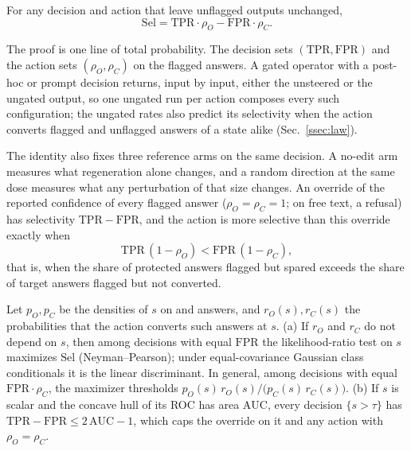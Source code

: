 \begin{proposition}
\label{prop:account}
For any decision and action that leave unflagged outputs unchanged,
\begin{equation}
\mathrm{Sel}=\mathrm{TPR}\cdot\rho_O-\mathrm{FPR}\cdot\rho_C .
\label{eq:account}
\end{equation}
\end{proposition}

The proof is one line of total probability. The decision sets
$(\mathrm{TPR},\mathrm{FPR})$ and the action sets $(\rho_O,\rho_C)$ on the
flagged answers. A gated operator with a post-hoc or prompt decision returns,
input by input, either the unsteered or the ungated output, so one ungated run
per action composes every such configuration; the ungated rates also predict
its selectivity when the action converts flagged and unflagged answers of a
state alike (Sec.~\ref{ssec:law}).

The identity also fixes three reference arms on the same decision. A no-edit
arm measures what regeneration alone changes, and a random direction at the
same dose measures what any perturbation of that size changes. An override of
the reported confidence of every flagged answer ($\rho_O=\rho_C=1$; on free
text, a refusal) has selectivity $\mathrm{TPR}-\mathrm{FPR}$, and the action is
more selective than this override exactly when
\begin{equation}
\mathrm{TPR}\,(1-\rho_O)<\mathrm{FPR}\,(1-\rho_C),
\label{eq:override}
\end{equation}
that is, when the share of protected answers flagged but spared exceeds the
share of target answers flagged but not converted.

\begin{theorem}
\label{thm:gate}
Let $p_O,p_C$ be the densities of $s$ on \ocw{} and \crok{} answers, and
$r_O(s),r_C(s)$ the probabilities that the action converts such answers at
$s$.
(a) If $r_O$ and $r_C$ do not depend on $s$, then among decisions with equal
$\mathrm{FPR}$ the likelihood-ratio test on $s$ maximizes $\mathrm{Sel}$
(Neyman--Pearson); under equal-covariance Gaussian
class conditionals it is the linear discriminant. In general, among decisions
with equal $\mathrm{FPR}\cdot\rho_C$, the maximizer thresholds
$p_O(s)\,r_O(s)/\big(p_C(s)\,r_C(s)\big)$.
(b) If $s$ is scalar and the concave hull of its ROC has area $\mathrm{AUC}$,
every decision $\{s>\tau\}$ has $\mathrm{TPR}-\mathrm{FPR}\le2\,\mathrm{AUC}-1$,
which caps the override on it and any action with $\rho_O=\rho_C$.
\end{theorem}

